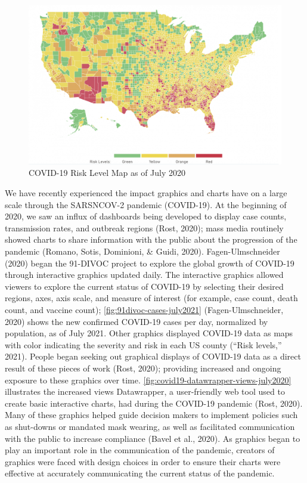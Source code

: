 \documentclass[print]{nuthesis}
\begin{document}
\begin{figure}[tbp]

{\centering \includegraphics[width=0.9\linewidth,]{images/covid19-summer2020-risk-map} 

}

\caption{COVID-19 Risk Level Map as of July 2020}\label{fig:covid19-summer2020-risk-map}
\end{figure}

We have recently experienced the impact graphics and charts have on a large scale through the SARSNCOV-2 pandemic (COVID-19).
At the beginning of 2020, we saw an influx of dashboards being developed to display case counts, transmission rates, and outbreak regions (Rost, 2020); mass media routinely showed charts to share information with the public about the progression of the pandemic (Romano, Sotis, Dominioni, \& Guidi, 2020).
Fagen-Ulmschneider (2020) began the 91-DIVOC project to explore the global growth of COVID-19 through interactive graphics updated daily.
The interactive graphics allowed viewers to explore the current status of COVID-19 by selecting their desired regions, axes, axis scale, and measure of interest (for example, case count, death count, and vaccine count); \cref{fig:91divoc-cases-july2021} (Fagen-Ulmschneider, 2020) shows the new confirmed COVID-19 cases per day, normalized by population, as of July 2021.
Other graphics displayed COVID-19 data as maps  with color indicating the severity and risk in each US county ({``Risk levels,''} 2021).
People began seeking out graphical displays of COVID-19 data as a direct result of these pieces of work (Rost, 2020); providing increased and ongoing exposure to these graphics over time.
\cref{fig:covid19-datawrapper-views-july2020} illustrates the increased views Datawrapper, a user-friendly web tool used to create basic interactive charts, had during the COVID-19 pandemic (Rost, 2020).
Many of these graphics helped guide decision makers to implement policies such as shut-downs or mandated mask wearing, as well as facilitated communication with the public to increase compliance (Bavel et al., 2020).
As graphics began to play an important role in the communication of the pandemic, creators of graphics were faced with design choices in order to ensure their charts were effective at accurately communicating the current status of the pandemic.
\end{document}
